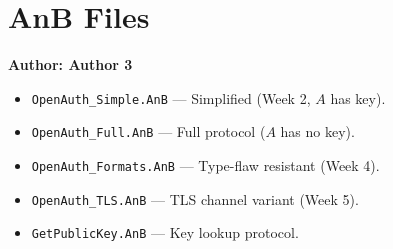 \documentclass[11pt,a4paper]{article}
\begin{document}
\hrulefill

\section{AnB Files}
\textbf{Author: Author 3}

\begin{itemize}
  \item \texttt{OpenAuth\_Simple.AnB} --- Simplified (Week 2, $A$ has key).
  \item \texttt{OpenAuth\_Full.AnB} --- Full protocol ($A$ has no key).
  \item \texttt{OpenAuth\_Formats.AnB} --- Type-flaw resistant (Week 4).
  \item \texttt{OpenAuth\_TLS.AnB} --- TLS channel variant (Week 5).
  \item \texttt{GetPublicKey.AnB} --- Key lookup protocol.
\end{itemize}
\end{document}

